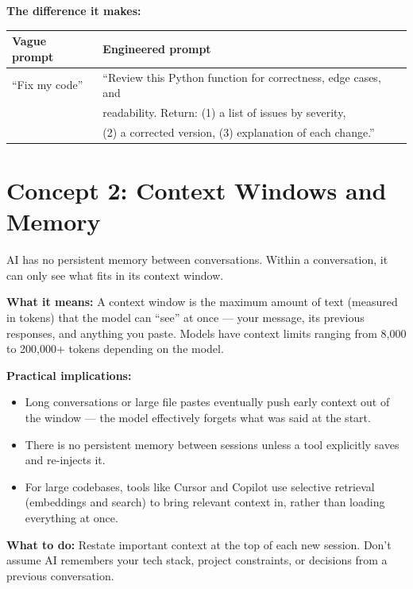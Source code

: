 \textbf{The difference it makes:}
\begin{center}
\begin{tabular}{ll}
\toprule
\textbf{Vague prompt} & \textbf{Engineered prompt} \\
\midrule
``Fix my code'' & ``Review this Python function for correctness, edge cases, and \\
& readability. Return: (1) a list of issues by severity, \\
& (2) a corrected version, (3) explanation of each change.'' \\
\bottomrule
\end{tabular}
\end{center}

\section{Concept 2: Context Windows and Memory}
\label{sec:context-window}

\begin{conceptbox}
AI has no persistent memory between conversations.
Within a conversation, it can only see what fits in its context window.
\end{conceptbox}

\textbf{What it means:}
A context window is the maximum amount of text (measured in tokens) that the model
can ``see'' at once --- your message, its previous responses, and anything you paste.
Models have context limits ranging from 8,000 to 200,000+ tokens depending on the
model.

\textbf{Practical implications:}
\begin{itemize}
  \item Long conversations or large file pastes eventually push early context out of
        the window --- the model effectively forgets what was said at the start.
  \item There is no persistent memory between sessions unless a tool explicitly saves
        and re-injects it.
  \item For large codebases, tools like Cursor and Copilot use selective retrieval
        (embeddings and search) to bring relevant context in, rather than loading
        everything at once.
\end{itemize}

\textbf{What to do:}
Restate important context at the top of each new session.
Don't assume AI remembers your tech stack, project constraints, or decisions from a
previous conversation.

